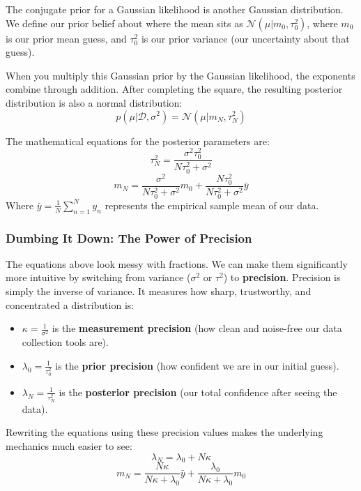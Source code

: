\documentclass{article}
\begin{document}
The conjugate prior for a Gaussian likelihood is another Gaussian distribution. We define our prior belief about where the mean sits as $\mathcal{N}(\mu| m_0, \tau_0^2)$, where $m_0$ is our prior mean guess, and $\tau_0^2$ is our prior variance (our uncertainty about that guess). 

When you multiply this Gaussian prior by the Gaussian likelihood, the exponents combine through addition. After completing the square, the resulting posterior distribution is also a normal distribution:
\begin{equation}
p(\mu|\mathcal{D}, \sigma^2) = \mathcal{N}(\mu| m_N, \tau_N^2)
\end{equation}

The mathematical equations for the posterior parameters are:
\begin{equation}
\tau_N^2 = \frac{\sigma^2 \tau_0^2}{N\tau_0^2 + \sigma^2}
\end{equation}
\begin{equation}
m_N = \frac{\sigma^2}{N\tau_0^2 + \sigma^2}m_0 + \frac{N\tau_0^2}{N\tau_0^2 + \sigma^2}\bar{y}
\end{equation}
Where $\bar{y} = \frac{1}{N}\sum_{n=1}^N y_n$ represents the empirical sample mean of our data.



\subsubsection{Dumbing It Down: The Power of Precision}
The equations above look messy with fractions. We can make them significantly more intuitive by switching from variance ($\sigma^2$ or $\tau^2$) to \textbf{precision}. Precision is simply the inverse of variance. It measures how sharp, trustworthy, and concentrated a distribution is:
\begin{itemize}
    \item $\kappa = \frac{1}{\sigma^2}$ is the \textbf{measurement precision} (how clean and noise-free our data collection tools are).
    \item $\lambda_0 = \frac{1}{\tau_0^2}$ is the \textbf{prior precision} (how confident we are in our initial guess).
    \item $\lambda_N = \frac{1}{\tau_N^2}$ is the \textbf{posterior precision} (our total confidence after seeing the data).
\end{itemize}

Rewriting the equations using these precision values makes the underlying mechanics much easier to see:
\begin{equation}
\lambda_N = \lambda_0 + N\kappa
\end{equation}
\begin{equation}
m_N = \frac{N\kappa}{N\kappa + \lambda_0}\bar{y} + \frac{\lambda_0}{N\kappa + \lambda_0}m_0
\end{equation}
\end{document}
